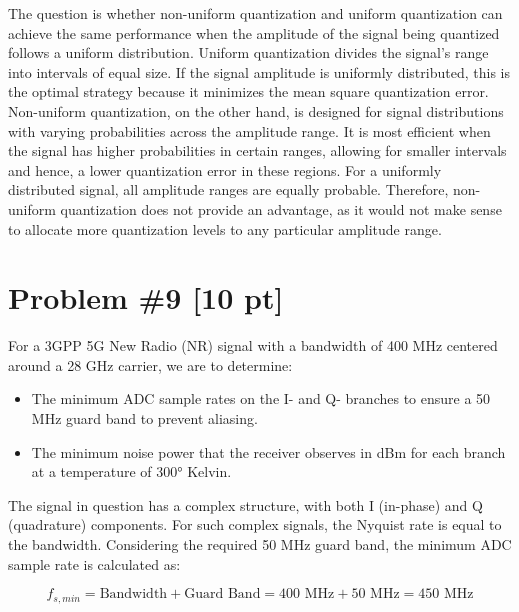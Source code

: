 \documentclass{article}
\begin{document}
The question is whether non-uniform quantization and uniform quantization can achieve the same performance when the amplitude of the signal being quantized follows a uniform distribution.
\newline\newline\newline
Uniform quantization divides the signal's range into intervals of equal size. If the signal amplitude is uniformly distributed, this is the optimal strategy because it minimizes the mean square quantization error.
\newline\newline
Non-uniform quantization, on the other hand, is designed for signal distributions with varying probabilities across the amplitude range. It is most efficient when the signal has higher probabilities in certain ranges, allowing for smaller intervals and hence, a lower quantization error in these regions.
\newline\newline
For a uniformly distributed signal, all amplitude ranges are equally probable. Therefore, non-uniform quantization does not provide an advantage, as it would not make sense to allocate more quantization levels to any particular amplitude range.



\newpage
\section*{Problem \#9 [10 pt]}
For a 3GPP 5G New Radio (NR) signal with a bandwidth of 400 MHz centered around a 28 GHz carrier, we are to determine:
\begin{itemize}
    \item The minimum ADC sample rates on the I- and Q- branches to ensure a 50 MHz guard band to prevent aliasing.
    \item The minimum noise power that the receiver observes in dBm for each branch at a temperature of 300° Kelvin.
\end{itemize}
\newline\newline
The signal in question has a complex structure, with both I (in-phase) and Q (quadrature) components. For such complex signals, the Nyquist rate is equal to the bandwidth. Considering the required 50 MHz guard band, the minimum ADC sample rate is calculated as:

\[ f_{s,min} = \text{Bandwidth} + \text{Guard Band} = 400 \text{ MHz} + 50 \text{ MHz} = 450 \text{ MHz} \]
\end{document}
